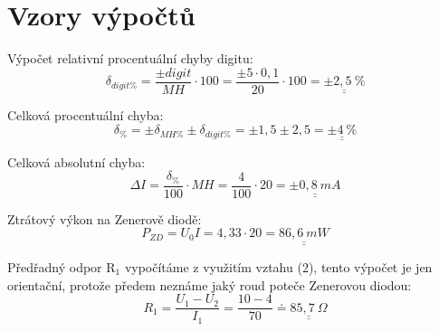 \section{Vzory výpočtů}
  
  Výpočet relativní procentuální chyby digitu:
  \begin{equation}
    \delta _{digit\%} = \dfrac{\pm digit}{MH} \cdot 100 = \dfrac{\pm 5 \cdot 0,1}{20} \cdot 100 = \underline{\underline{\pm 2,5~\%}}
    \nonumber
  \end{equation}
  
  Celková procentuální chyba:
  \begin{equation}
    \delta_{\%} = \pm\delta_{MH\%} \pm \delta_{digit\%} = \pm 1,5 \pm 2,5 = \underline{\underline{\pm 4~\%}}
    \nonumber
  \end{equation}
  
  Celková absolutní chyba:
  \begin{equation}
    \Delta I = \dfrac{\delta_\%}{100} \cdot MH = \dfrac{4}{100} \cdot 20 = \underline{\underline{\pm 0,8~mA}}
    \nonumber
  \end{equation}
  
  Ztrátový výkon na Zenerově diodě:
  \begin{equation}
    P_{ZD} = U_0I =  4,33 \cdot 20 = \underline{\underline{86,6~mW}}
    \nonumber
  \end{equation}
  
  Předřadný odpor R$_1$ vypočítáme z využitím vztahu (2), tento výpočet je jen orientační, protože předem neznáme jaký roud poteče Zenerovou diodou:
  \begin{equation}
    R_1 = \dfrac{U_1-U_2}{I_1} =  \dfrac{10-4}{70} \doteq \underline{\underline{85,7~\Omega}}
    \nonumber
  \end{equation}
